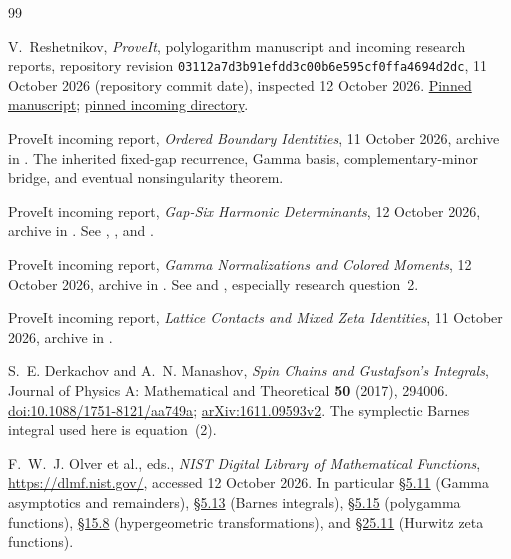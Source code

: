 \begin{thebibliography}{99}

V.~Reshetnikov, \emph{ProveIt}, polylogarithm manuscript and incoming
research reports, repository revision
\texttt{03112a7d3b91efdd3c00b6e595cf0ffa4694d2dc},
11 October 2026 (repository commit date), inspected 12 October 2026.
\href{https://github.com/VladimirReshetnikov/ProveIt/tree/03112a7d3b91efdd3c00b6e595cf0ffa4694d2dc/Analysis/Polylogarithms/docs/manuscript}{Pinned manuscript};
\href{https://github.com/VladimirReshetnikov/ProveIt/tree/03112a7d3b91efdd3c00b6e595cf0ffa4694d2dc/docs/incoming}{pinned incoming directory}.

ProveIt incoming report, \emph{Ordered Boundary Identities},
11 October 2026, archive
in \cite{ProveIt}. The inherited fixed-gap recurrence, Gamma basis,
complementary-minor bridge, and eventual nonsingularity theorem.

ProveIt incoming report, \emph{Gap-Six Harmonic Determinants},
12 October 2026, archive
in \cite{ProveIt}. See ,
, and .

ProveIt incoming report, \emph{Gamma Normalizations and Colored Moments},
12 October 2026, archive
in \cite{ProveIt}. See  and
, especially research question~2.

ProveIt incoming report, \emph{Lattice Contacts and Mixed Zeta Identities},
11 October 2026, archive
in \cite{ProveIt}.

S.~E. Derkachov and A.~N. Manashov,
\emph{Spin Chains and Gustafson's Integrals},
Journal of Physics A: Mathematical and Theoretical \textbf{50} (2017),
294006. \href{https://doi.org/10.1088/1751-8121/aa749a}{doi:10.1088/1751-8121/aa749a};
\href{https://arxiv.org/abs/1611.09593v2}{arXiv:1611.09593v2}.
The symplectic Barnes integral used here is equation~(2).

F.~W.~J. Olver et al., eds.,
\emph{NIST Digital Library of Mathematical Functions},
\url{https://dlmf.nist.gov/}, accessed 12 October 2026.
In particular \href{https://dlmf.nist.gov/5.11}{\S5.11}
(Gamma asymptotics and remainders),
\href{https://dlmf.nist.gov/5.13}{\S5.13}
(Barnes integrals), \href{https://dlmf.nist.gov/5.15}{\S5.15}
(polygamma functions), \href{https://dlmf.nist.gov/15.8}{\S15.8}
(hypergeometric transformations), and
\href{https://dlmf.nist.gov/25.11}{\S25.11}
(Hurwitz zeta functions).


\end{thebibliography}
